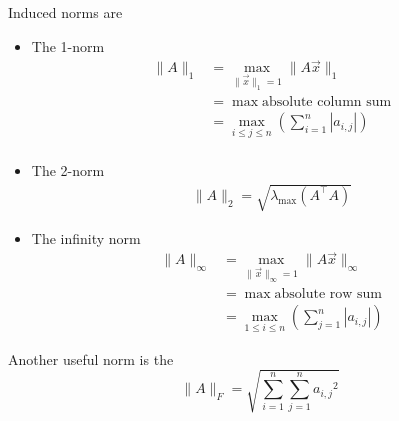 \begin{remark}
    Induced norms are

    \begin{itemize}
        \item The 1-norm \begin{align*}
                  \| A \|_1
                   & = \max_{\| \vec{x} \|_1 = 1} \| A \vec{x} \|_1                    \\
                   & = \max \text{absolute column sum}                                 \\
                   & = \max_{i \leq j \leq n} \left( \sum_{i=1}^n | a_{i, j} | \right) \\
              \end{align*}

        \item The 2-norm
              \begin{align*}
                  \| A \|_2 = \sqrt{{\lambda_{\max} (A^\top A)}}
              \end{align*}

        \item The infinity norm
              \begin{align*}
                  \| A \|_\infty
                   & = \max_{\| \vec{x} \|_\infty = 1} \| A \vec{x} \|_\infty          \\
                   & = \max \text{absolute row sum}                                    \\
                   & = \max_{1 \leq i \leq n} \left( \sum_{j=1}^n | a_{i, j} | \right)
              \end{align*}
    \end{itemize}

    Another useful norm is the  \[
        \| A \|_F = \sqrt{\sum_{i=1}^n \sum_{j=1}^n {a_{i, j}}^2}
    \]
\end{remark}

